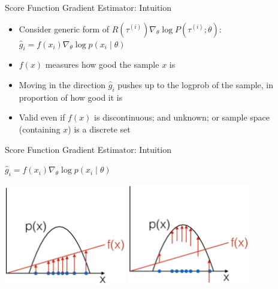 \begin{frame}[c]{Score Function Gradient Estimator: Intuition}
	
	\begin{itemize}
		\item Consider generic form of $R(\tau^{(i)}) \nabla_\theta \log P(\tau^{(i)}; \theta)$:\\
		$\hat{g}_i = f(x_i) \nabla_\theta \log p(x_i \mid \theta)$
		\item $f(x)$ measures how good the sample $x$ is
		\item Moving in the direction $\hat{g}_i$ pushes up to the logprob of the sample, in proportion of how good it is
		\item Valid even if $f(x)$ is discontinuous; and unknown; or sample space (containing $x$) is a discrete set
	\end{itemize}
	
\end{frame}
\begin{frame}[c]{Score Function Gradient Estimator: Intuition}
	

\centering
$\hat{g}_i = f(x_i) \nabla_\theta \log p(x_i \mid \theta)$
\bigskip

\includegraphics[width=0.4\textwidth]{images/scoring_function_1.png}
\pause
\includegraphics[width=0.4\textwidth]{images/scoring_function_2.png}
	
\end{frame}
